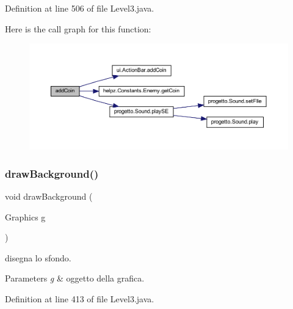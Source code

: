 Definition at line 506 of file Level3.\+java.

Here is the call graph for this function\+:\nopagebreak
\begin{figure}[H]
\begin{center}
\leavevmode
\includegraphics[width=350pt]{classscenes_1_1_level3_a9f0f7dc28e596d2ebcd06e27ef05d9fd_cgraph}
\end{center}
\end{figure}
\mbox{\label{classscenes_1_1_level3_a62bcb07be9e39896e5837a9d396e7235}} 
\subsubsection{\texorpdfstring{draw\+Background()}{drawBackground()}}
{\footnotesize\ttfamily void draw\+Background (\begin{DoxyParamCaption}\item[{Graphics}]{g }\end{DoxyParamCaption})\hspace{0.3cm}{\ttfamily [private]}}



disegna lo sfondo. 


\begin{DoxyParams}{Parameters}
{\em g} & oggetto della grafica. \\
\hline
\end{DoxyParams}


Definition at line 413 of file Level3.\+java.

